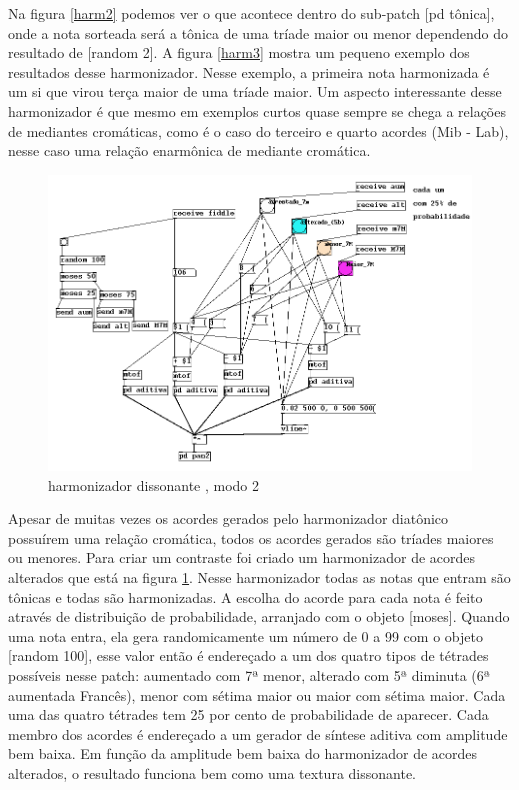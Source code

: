 \documentclass{ppgmus}
\begin{document}
Na figura \ref{harm2} podemos ver o que acontece dentro do sub-patch [pd tônica], onde a nota sorteada 
será a tônica de uma tríade maior ou menor dependendo do resultado de [random 2]. A figura \ref{harm3} 
mostra um pequeno exemplo dos resultados desse harmonizador. Nesse exemplo, a primeira nota 
harmonizada é um si que virou terça maior de uma tríade maior. Um aspecto interessante desse 
harmonizador é que mesmo em exemplos curtos quase sempre se chega a relações de mediantes 
cromáticas, como é o caso do terceiro e quarto acordes (Mib - Lab), nesse caso uma relação 
enarmônica de mediante cromática.

\begin{figure}
\includegraphics[scale=.5]{harm4}
\caption{harmonizador dissonante , modo 2}
\label{harm4}
\end{figure}

Apesar de muitas vezes os acordes gerados pelo harmonizador diatônico possuírem uma relação 
cromática, todos os acordes gerados são tríades maiores ou menores. Para criar um contraste 
foi criado um harmonizador de acordes alterados que está na figura \ref{harm4}. Nesse harmonizador todas as notas 
que entram são tônicas e todas são harmonizadas. 
	A escolha do acorde para cada nota é feito através de distribuição de probabilidade, 
arranjado com o objeto [moses]. Quando uma nota entra, ela gera randomicamente um número de 0 
a 99 com o objeto [random 100], esse valor então é endereçado a um dos quatro tipos de tétrades 
possíveis nesse patch: aumentado com 7ª menor, alterado com 5ª diminuta (6ª aumentada Francês), 
menor com sétima maior ou maior com sétima maior. Cada uma das quatro tétrades tem 25 por cento 
de probabilidade de aparecer. Cada membro dos acordes é endereçado a um gerador de síntese aditiva 
com amplitude bem baixa. Em função da amplitude bem baixa do harmonizador de acordes alterados, o 
resultado funciona bem como uma textura dissonante.
\end{document}
